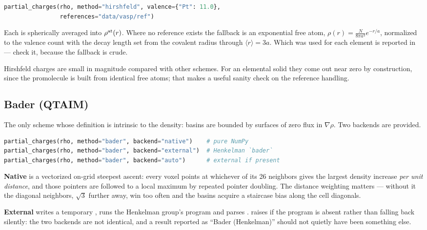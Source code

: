\begin{lstlisting}[language=Python]
partial_charges(rho, method="hirshfeld", valence={"Pt": 11.0},
                references="data/vasp/ref")
\end{lstlisting}

Each  is spherically averaged into
$\rho^{\rm at}(r)$. Where no reference exists the fallback is an exponential
free atom, $\rho(r) = \frac{N}{8\pi a^3}e^{-r/a}$, normalized to the valence
count with the decay length set from the covalent radius through
$\langle r\rangle = 3a$. Which was used for each element is reported in
 --- check it, because the fallback is crude.

\begin{pnote}
Hirshfeld charges are small in magnitude compared with other schemes. For an
elemental solid they come out near zero by construction, since the promolecule
is built from identical free atoms; that makes a useful sanity check on the
reference handling.
\end{pnote}

\subsection{Bader (QTAIM)}

The only scheme whose definition is intrinsic to the density: basins are
bounded by surfaces of zero flux in $\nabla\rho$. Two backends are provided.

\begin{lstlisting}[language=Python]
partial_charges(rho, method="bader", backend="native")    # pure NumPy
partial_charges(rho, method="bader", backend="external")  # Henkelman `bader`
partial_charges(rho, method="bader", backend="auto")      # external if present
\end{lstlisting}

\textbf{Native} is a vectorized on-grid steepest ascent: every voxel points at
whichever of its 26 neighbors gives the largest density increase \emph{per
unit distance}, and those pointers are followed to a local maximum by repeated
pointer doubling. The distance weighting matters --- without it the diagonal
neighbors, $\sqrt3$ further away, win too often and the basins acquire a
staircase bias along the cell diagonals.

\textbf{External} writes a temporary , runs the Henkelman group's
 program and parses .  raises
if the program is absent rather than falling back silently: the two backends
are not identical, and a result reported as ``Bader (Henkelman)'' should not
quietly have been something else.

